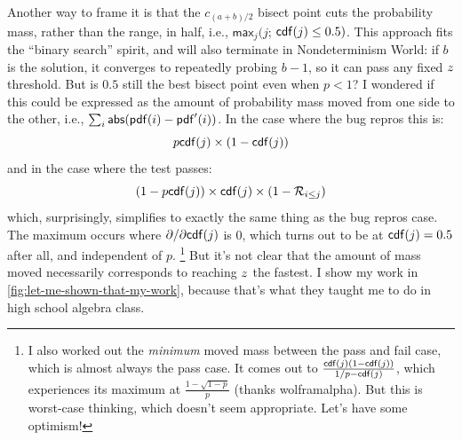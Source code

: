 \documentclass[11pt]{sigplanconf}
\begin{document}
Another way to frame it is that the $c_{(a+b)/2}$ bisect point
cuts the probability mass, rather than the range, in half,
i.e., $\mathsf{max}_j (j$; $\mathsf{cdf}(j) \le 0.5)$.
This approach
fits the ``binary search'' spirit,
and will also terminate in Nondeterminism World:
if $b$ is the solution, it converges to repeatedly probing $b-1$,
so it can pass any fixed $z$ threshold.
%
But is $0.5$ still the best bisect point even when $p<1$?
I wondered if this could be expressed as the amount of probability mass moved from one side to the other,
i.e., $\sum_i \mathsf{abs}(\mathsf{pdf}(i) - \mathsf{pdf}'(i))$.
In the case where the bug repros this is:
\[
	p\mathsf{cdf}(j) \times (1-\mathsf{cdf}(j))
\]
and in the case where the test passes:
\[
	(1-p\mathsf{cdf}(j)) \times \mathsf{cdf}(j) \times (1-\mathcal{R}_{i\le j})
\]
which, surprisingly, simplifies to exactly the same thing as the bug repros case.
The maximum occurs where $\partial/\partial \mathsf{cdf}(j)$ is 0,
which turns out to be at $\mathsf{cdf}(j)=0.5$ after all, and independent of $p$.%
\footnote{I also worked out the {\it minimum} moved mass between the pass and fail case,
which is almost always the pass case.
It comes out to
$\frac{\mathsf{cdf}(j)(1-\mathsf{cdf}(j))}{1/p-\mathsf{cdf}(j)}$,
which experiences its maximum at
$\frac{1-\sqrt{1-p}}{p}$ (thanks wolframalpha).
But this is worst-case thinking, which doesn't seem appropriate.
Let's have some optimism!}
But it's not clear that the amount of mass moved
necessarily corresponds to reaching $z$ the fastest.
I show my work in \cref{fig:let-me-shown-that-my-work},
because that's what they taught me to do in high school algebra class.
\end{document}
